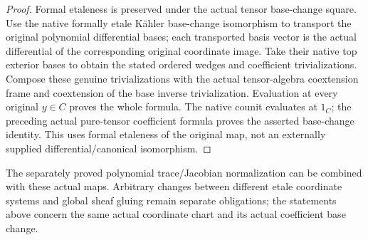 \begin{proof}
Formal etaleness is preserved under the actual tensor base-change
square.  Use the native formally etale K\"ahler base-change
isomorphism to transport the original polynomial differential
bases; each transported basis vector is the actual differential
of the corresponding original coordinate image.  Take their
native top exterior bases to obtain the stated ordered wedges
and coefficient trivializations.  Compose these genuine
trivializations with the actual tensor-algebra coextension frame
and coextension of the base inverse trivialization.  Evaluation
at every original $y\in C$ proves the whole formula.  The native
counit evaluates at $1_C$; the preceding actual pure-tensor
coefficient formula proves the asserted base-change identity.
This uses formal etaleness of the original map, not an externally
supplied differential/canonical isomorphism.
\end{proof}

The separately proved polynomial trace/Jacobian normalization can
be combined with these actual maps.  Arbitrary changes between
different etale coordinate systems and global sheaf gluing remain
separate obligations; the statements above concern the same actual
coordinate chart and its actual coefficient base change.

